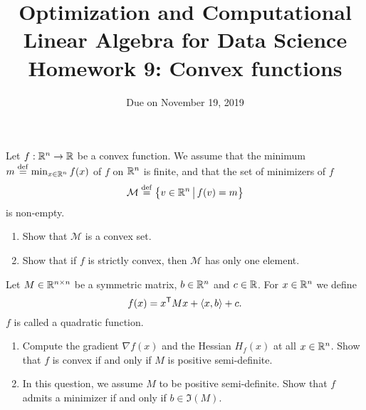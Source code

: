 \documentclass[11pt,nocut]{article}
\title{\vspace{-2.0cm}%
	Optimization and Computational Linear Algebra for Data Science\\
Homework 9: Convex functions}
\date{\vspace{-1cm}Due on November 19, 2019}
\begin{document}
\maketitle



\vspace{4mm}

\begin{problem}[2 points]
	Let $f: \mathbb{R}^n \to \mathbb{R}$ be a convex function. We assume that the minimum $m \overset{\rm def}{=} \min_{x \in \mathbb{R}^n} f(x)$ of $f$ on $\mathbb{R}^n$ is finite, and that the set of minimizers of $f$
$$
\mathcal{M} \overset{\rm def}{=} \big\{ v \in \mathbb{R}^n \, \big| \, f(v) = m \big\}
$$
is non-empty.

	\begin{enumerate}[label=\normalfont(\textbf{\alph*})]
		\item Show that $\mathcal{M}$ is a convex set.
		\item Show that if $f$ is strictly convex, then $\mathcal{M}$ has only one element.
	\end{enumerate}

\end{problem}

\vspace{4mm}

\begin{problem}[2 points]
	Let $M \in \mathbb{R}^{n \times n}$ be a symmetric matrix, $b \in \mathbb{R}^n$ and $c \in \mathbb{R}$.
	For $x \in \mathbb{R}^n$ we define
	$$
	f(x) = x^{{\sf T}} M x + \langle x,b \rangle + c.
	$$
	$f$ is called a quadratic function.
	\begin{enumerate}[label=\normalfont(\textbf{\alph*})]
		\item Compute the gradient $\nabla f(x)$ and the Hessian $H_f(x)$ at all $x \in \mathbb{R}^n$. Show that $f$ is convex if and only if $M$ is positive semi-definite.
		\item In this question, we assume $M$ to be positive semi-definite. Show that $f$ admits a minimizer if and only if $b \in \Im(M)$.
	\end{enumerate}
\end{problem}

\newpage
\end{document}

